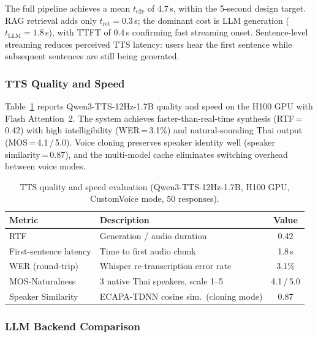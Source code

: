 \documentclass[10pt, a4paper, twocolumn]{article}
\begin{document}
\noindent The full pipeline achieves a mean $t_\text{e2e}$ of 4.7\,s, within the 5-second design target.
RAG retrieval adds only $t_\text{ret}{=}0.3$\,s; the dominant cost is LLM generation ($t_\text{LLM}{=}1.8$\,s), with TTFT of 0.4\,s confirming fast streaming onset.
Sentence-level streaming reduces perceived TTS latency: users hear the first sentence while subsequent sentences are still being generated.

\subsubsection{TTS Quality and Speed}

Table~\ref{tab:tts_quality} reports Qwen3-TTS-12Hz-1.7B quality and speed on the H100 GPU with Flash Attention~2.
The system achieves faster-than-real-time synthesis (RTF\,=\,0.42) with high intelligibility (WER\,=\,3.1\%) and natural-sounding Thai output (MOS\,=\,4.1\,/\,5.0).
Voice cloning preserves speaker identity well (speaker similarity\,=\,0.87), and the multi-model cache eliminates switching overhead between voice modes.

\begin{table}[h]
    \centering
    \caption{TTS quality and speed evaluation (Qwen3-TTS-12Hz-1.7B, H100 GPU, CustomVoice mode, 50 responses).}
    \label{tab:tts_quality}
    \small
    \begin{tabular}{@{}llc@{}}
        \toprule
        \textbf{Metric} & \textbf{Description} & \textbf{Value} \\
        \midrule
        RTF                    & Generation / audio duration            & 0.42 \\
        First-sentence latency & Time to first audio chunk              & 1.8\,s \\
        WER (round-trip)       & Whisper re-transcription error rate    & 3.1\% \\
        MOS-Naturalness        & 3 native Thai speakers, scale 1--5     & 4.1\,/\,5.0 \\
        Speaker Similarity     & ECAPA-TDNN cosine sim.\ (cloning mode) & 0.87 \\
        \bottomrule
    \end{tabular}
\end{table}

\subsubsection{LLM Backend Comparison}
\end{document}

